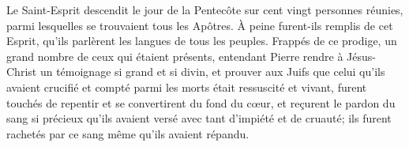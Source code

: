 Le Saint-Esprit descendit le jour de la Pentecôte
	sur cent vingt personnes réunies,
	parmi lesquelles se trouvaient tous les Apôtres.
À peine furent-ils remplis de cet Esprit,
	qu’ils parlèrent les langues de tous les peuples.
Frappés de ce prodige, un grand nombre de ceux qui étaient présents,
	entendant Pierre rendre à Jésus-Christ un témoignage si grand et si divin,
	et prouver aux Juifs que celui qu’ils avaient crucifié
		et compté parmi les morts était ressuscité et vivant,
	furent touchés de repentir et se convertirent du fond du cœur,
	et reçurent le pardon du sang si précieux
	qu’ils avaient versé avec tant d’impiété et de cruauté;
	ils furent rachetés par ce sang même qu’ils avaient répandu.
